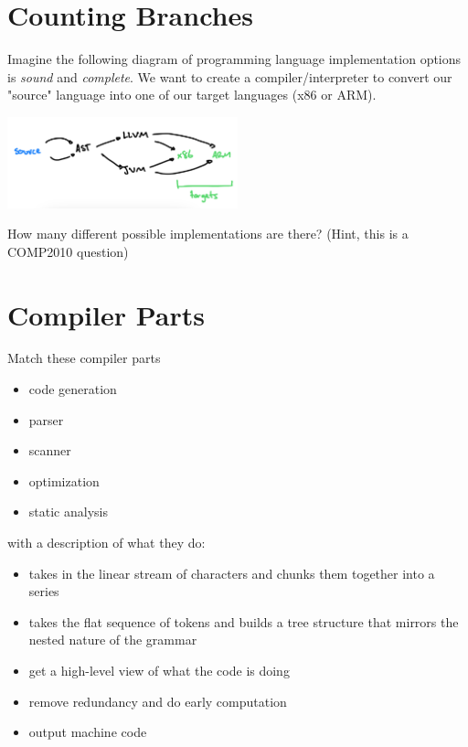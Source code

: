 \documentclass[twoside=false, DIV=14]{scrartcl}
\begin{document}
  \section*{Counting Branches}
Imagine the following diagram of programming language implementation options is \emph{sound} and \emph{complete}.  We want to create a compiler/interpreter to convert our "source" language into one of our target languages (x86 or ARM).
  
\includegraphics[width=0.5\textwidth]{2_paths.jpeg}

How many different possible implementations are there? (Hint, this is a COMP2010 question)

\section*{Compiler Parts}
\begin{minipage}[t]{0.4\textwidth}
Match these compiler parts 
\begin{itemize}
  \item code generation 
  \item parser 
  \item scanner
  \item optimization
  \item static analysis
\end{itemize}
\end{minipage}
\hspace{2em}
\begin{minipage}[t]{0.4\textwidth}
with a description of what they do:
\begin{itemize}
  \item takes in the linear stream of characters and chunks them together into a series
  \item takes the flat sequence of tokens and builds a tree structure that mirrors the nested nature of the grammar
  \item get a high-level view of what the code is doing
  \item remove redundancy and do early computation
  \item output machine code
\end{itemize}
\end{minipage}
\end{document}
